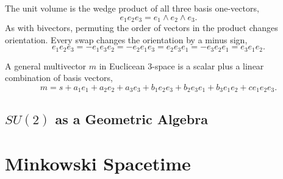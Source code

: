 	The unit volume is the wedge product of all three basis one-vectors,
	\[
	e_1e_2e_3 = e_1 \wedge e_2 \wedge e_3.  
	\]
	As with bivectors, permuting the order of vectors in the product changes orientation. Every swap changes the orientation by a minus sign,
	\[
	e_1e_2e_3 = -e_1e_3e_2 = -e_2e_1e_3 = e_2e_3e_1 = -e_3e_2e_1 = e_3e_1e_2.
	\]
	
	A general multivector $m$ in Euclicean 3-space is a scalar plus a linear combination of basis vectors,
	\[
	m = s + a_1e_1 + a_2e_2 + a_3e_3 + b_1e_2e_3 + b_2e_3e_1 + b_3e_1e_2 + ce_1e_2e_3.
	\] 
	\subsection{$SU\left( 2\right) $ as a Geometric Algebra}
	
	\section{Minkowski Spacetime}